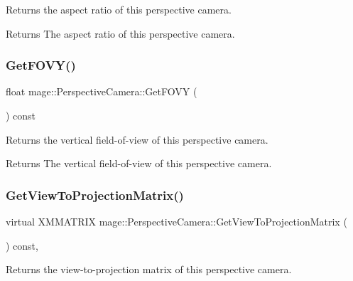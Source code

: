 Returns the aspect ratio of this perspective camera.

\begin{DoxyReturn}{Returns}
The aspect ratio of this perspective camera. 
\end{DoxyReturn}
\hypertarget{classmage_1_1_perspective_camera_a15223034b30ca691c51de8850c033293}{}\label{classmage_1_1_perspective_camera_a15223034b30ca691c51de8850c033293} 
\subsubsection{\texorpdfstring{Get\+F\+O\+V\+Y()}{GetFOVY()}}
{\footnotesize\ttfamily float mage\+::\+Perspective\+Camera\+::\+Get\+F\+O\+VY (\begin{DoxyParamCaption}{ }\end{DoxyParamCaption}) const}

Returns the vertical field-\/of-\/view of this perspective camera.

\begin{DoxyReturn}{Returns}
The vertical field-\/of-\/view of this perspective camera. 
\end{DoxyReturn}
\hypertarget{classmage_1_1_perspective_camera_a83a38a4e8180707df2323130f9cee4a5}{}\label{classmage_1_1_perspective_camera_a83a38a4e8180707df2323130f9cee4a5} 
\subsubsection{\texorpdfstring{Get\+View\+To\+Projection\+Matrix()}{GetViewToProjectionMatrix()}}
{\footnotesize\ttfamily virtual X\+M\+M\+A\+T\+R\+IX mage\+::\+Perspective\+Camera\+::\+Get\+View\+To\+Projection\+Matrix (\begin{DoxyParamCaption}{ }\end{DoxyParamCaption}) const\hspace{0.3cm}{\ttfamily [override]}, {\ttfamily [virtual]}}

Returns the view-\/to-\/projection matrix of this perspective camera.

